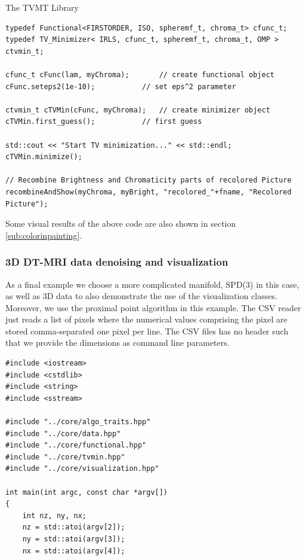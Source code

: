\begin{chapter}{The TVMT Library}
\cppinline
\begin{lstlisting}[label=code:tut2_functionalmin,caption={Functional and minimizer definition, first guess and minimization}]
typedef Functional<FIRSTORDER, ISO, spheremf_t, chroma_t> cfunc_t;
typedef TV_Minimizer< IRLS, cfunc_t, spheremf_t, chroma_t, OMP > ctvmin_t;

cfunc_t cFunc(lam, myChroma);	    // create functional object
cFunc.seteps2(1e-10);		    // set eps^2 parameter

ctvmin_t cTVMin(cFunc, myChroma);   // create minimizer object
cTVMin.first_guess();		    // first guess

std::cout << "Start TV minimization..." << std::endl;
cTVMin.minimize();		    

// Recombine Brightness and Chromaticity parts of recolored Picture
recombineAndShow(myChroma, myBright, "recolored_"+fname, "Recolored Picture");
\end{lstlisting}

Some visual results of the above code are also shown in section \ref{sub:colorinpainting}.




\subsubsection{3D DT-MRI data denoising and visualization} %
\label{ssub:dti_tut}
As a final example we choose a more complicated manifold, SPD(3) in this case, as well as 3D data to also demonstrate the use of the visualization classes. Moreover, we use
the proximal point algorithm in this example. The CSV reader just reads a list of pixels where the numerical values comprising the pixel are stored comma-separated one pixel
per line. The CSV files has no header such that we provide the dimensions as command line parameters.

\cppinline
\begin{lstlisting}[label=code:tut3_init,caption={Initialization}]
#include <iostream>
#include <cstdlib>
#include <string>
#include <sstream>

#include "../core/algo_traits.hpp"
#include "../core/data.hpp"
#include "../core/functional.hpp"
#include "../core/tvmin.hpp"
#include "../core/visualization.hpp"

int main(int argc, const char *argv[])
{       
    int nz, ny, nx;
    nz = std::atoi(argv[2]);
    ny = std::atoi(argv[3]);
    nx = std::atoi(argv[4]);


\end{lstlisting}
\end{chapter}
